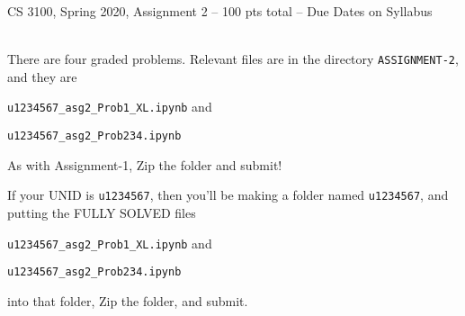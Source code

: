 \documentclass[12pt]{article}
\begin{document}



\begin{center}
\begin{large}
  CS 3100, Spring 2020, Assignment 2 -- 100 pts total -- Due Dates on Syllabus
  \ \\
  \ \\      
\end{large}


\end{center}
\date{}


\noindent There are four graded problems.
Relevant files are in the directory \verb|ASSIGNMENT-2|, and they are

\verb|u1234567_asg2_Prob1_XL.ipynb| and

\verb|u1234567_asg2_Prob234.ipynb|

As with Assignment-1, Zip the folder and submit!

 If your UNID is     \verb|u1234567|, then you'll be
making a folder named \verb|u1234567|, and putting the FULLY SOLVED
files

\verb|u1234567_asg2_Prob1_XL.ipynb| and

\verb|u1234567_asg2_Prob234.ipynb|

into that folder, Zip the folder, and submit.
\end{document}
